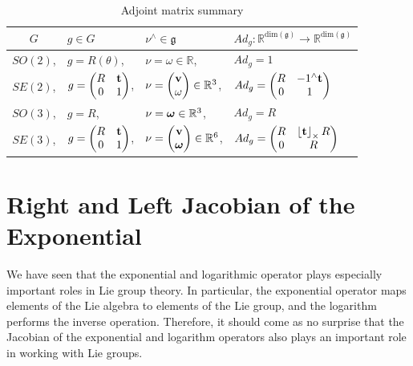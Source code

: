 \begin{table}[hhhht]
\caption{Adjoint matrix summary}
\label{tab:adjoint_matrix}
\bgroup
\def\arraystretch{1.0}
\begin{tabular}{clll}
	\toprule
	$G$ & $g\in G$ & $\nu^\wedge \in \mathfrak{g}$ & $Ad_g: \mathbb{R}^{\text{dim}(\mathfrak{g})} \to \mathbb{R}^{\text{dim}(\mathfrak{g})}$ \\
	\midrule
	$SO(2)$, & $g=R(\theta)$, & $\nu = \omega\in\mathbb{R}$, & $Ad_g = 1$ \\
	$SE(2)$, & $g=\begin{pmatrix} R & \mathbf{t} \\ 0 & 1 \end{pmatrix}$, & $\nu = \begin{pmatrix}\mathbf{v} \\ \omega \end{pmatrix} \in \mathbb{R}^3$, & $Ad_g = \begin{pmatrix} R & -1^\wedge\mathbf{t} \\ 0 & 1 \end{pmatrix}$ \\
	$SO(3)$, & $g=R$, & $\nu = \boldsymbol{\omega} \in \mathbb{R}^3$, & $Ad_g = R$ \\
	$SE(3)$, & $g=\begin{pmatrix} R & \mathbf{t} \\ 0 & 1\end{pmatrix}$, & $\nu = \begin{pmatrix}\mathbf{v} \\ \boldsymbol{\omega} \end{pmatrix} \in \mathbb{R}^6$, & $Ad_g = \begin{pmatrix} R & \left\lfloor\mathbf{t}\right\rfloor_{\times} R \\ 0 & R \end{pmatrix}$ \\
	\bottomrule
\end{tabular}
\egroup
\end{table}

\section{Right and Left Jacobian of the Exponential}

We have seen that the exponential and logarithmic operator plays especially important roles in Lie group theory.  In particular, the exponential operator maps elements of the Lie algebra to elements of the Lie group, and the logarithm performs the inverse operation.  Therefore, it should come as no surprise that the Jacobian of the exponential and logarithm operators also plays an important role in working with Lie groups.



